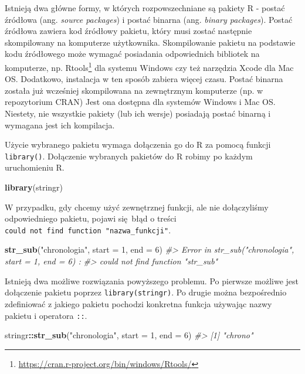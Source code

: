 \documentclass[paper=6in:9in,pagesize=pdftex,headinclude=on,footinclude=on,10pt]{scrbook}
\newenvironment{Shaded}{\begin{snugshade}}{\end{snugshade}}
\newcommand{\CommentTok}[1]{\textcolor[rgb]{0.56,0.35,0.01}{\textit{#1}}}
\newcommand{\DataTypeTok}[1]{\textcolor[rgb]{0.13,0.29,0.53}{#1}}
\newcommand{\DecValTok}[1]{\textcolor[rgb]{0.00,0.00,0.81}{#1}}
\newcommand{\KeywordTok}[1]{\textcolor[rgb]{0.13,0.29,0.53}{\textbf{#1}}}
\newcommand{\NormalTok}[1]{#1}
\newcommand{\OperatorTok}[1]{\textcolor[rgb]{0.81,0.36,0.00}{\textbf{#1}}}
\newcommand{\StringTok}[1]{\textcolor[rgb]{0.31,0.60,0.02}{#1}}
\DeclareRobustCommand{\href}[2]{#2\footnote{\url{#1}}}
\let\BeginKnitrBlock\begin \let\EndKnitrBlock\end
\begin{document}
\BeginKnitrBlock{rmdinfo}
Istnieją dwa główne formy, w których rozpowszechniane są pakiety R - postać źródłowa (ang. \emph{source packages}) i postać binarna (ang. \emph{binary packages}).
Postać źródłowa zawiera kod źródłowy pakietu, który musi zostać następnie skompilowany na komputerze użytkownika.
Skompilowanie pakietu na podstawie kodu źródłowego może wymagać posiadania odpowiednich bibliotek na komputerze, np. \href{https://cran.r-project.org/bin/windows/Rtools/}{Rtools} dla systemu Windows czy też narzędzia Xcode dla Mac OS.
Dodatkowo, instalacja w ten sposób zabiera więcej czasu.
Postać binarna została już wcześniej skompilowana na zewnętrznym komputerze (np. w repozytorium CRAN)
Jest ona dostępna dla systemów Windows i Mac OS.
Niestety, nie wszystkie pakiety (lub ich wersje) posiadają postać binarną i wymagana jest ich kompilacja.
\EndKnitrBlock{rmdinfo}

Użycie wybranego pakietu wymaga dołączenia go do R za pomocą funkcji \texttt{library()}.
Dołączenie wybranych pakietów do R robimy po każdym uruchomieniu R.

\begin{Shaded}
\begin{Highlighting}[]
\KeywordTok{library}\NormalTok{(stringr)}
\end{Highlighting}
\end{Shaded}

W przypadku, gdy chcemy użyć zewnętrznej funkcji, ale nie dołączyliśmy odpowiedniego pakietu, pojawi się~błąd o treści \texttt{could\ not\ find\ function\ "nazwa\_funkcji"}.

\begin{Shaded}
\begin{Highlighting}[]
\KeywordTok{str_sub}\NormalTok{(}\StringTok{"chronologia"}\NormalTok{, }\DataTypeTok{start =} \DecValTok{1}\NormalTok{, }\DataTypeTok{end =} \DecValTok{6}\NormalTok{)}
\CommentTok{#> Error in str_sub("chronologia", start = 1, end = 6) : }
\CommentTok{#>  could not find function "str_sub"}
\end{Highlighting}
\end{Shaded}

Istnieją dwa możliwe rozwiązania powyższego problemu.
Po pierwsze możliwe jest dołączenie pakietu poprzez \texttt{library(stringr)}.
Po drugie można bezpośrednio zdefiniować z jakiego pakietu pochodzi konkretna funkcja używając nazwy pakietu i operatora \texttt{::}.

\begin{Shaded}
\begin{Highlighting}[]
\NormalTok{stringr}\OperatorTok{::}\KeywordTok{str_sub}\NormalTok{(}\StringTok{"chronologia"}\NormalTok{, }\DataTypeTok{start =} \DecValTok{1}\NormalTok{, }\DataTypeTok{end =} \DecValTok{6}\NormalTok{)}
\CommentTok{#> [1] "chrono"}
\end{Highlighting}
\end{Shaded}
\end{document}
